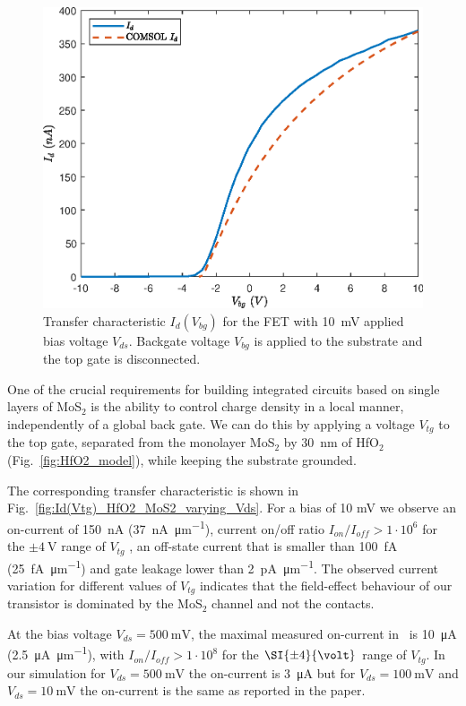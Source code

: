 \documentclass[electronics,article,submit,moreauthors,pdftex]{Definitions/mdpi}
\begin{document}
\begin{figure}[H]
	\centering
	\includegraphics[width=.75\textwidth]{Grafici/Id(Vbg)_HfO2_MoS2.eps} 
	\caption{Transfer characteristic $I_d(V_{bg})$ for the FET with \SI{10}{\milli \volt} applied bias voltage $V_{ds}$. Backgate voltage $V_{bg}$ is applied to the substrate and the top gate is disconnected.}
	\label{fig:Id(Vbg)_HfO2_MoS2}
\end{figure}

One of the crucial requirements for building integrated circuits based on single layers of MoS$_2$ is the ability to control charge density in a local manner, independently of a global back gate. We can do this by applying a voltage $V_{tg}$ to the top gate, separated from the monolayer MoS$_2$ by \SI{30}{\nano \meter} of HfO$_2$ (Fig.~\ref{fig:HfO2_model}), while keeping the substrate grounded.

The corresponding transfer characteristic is shown in Fig.~\ref{fig:Id(Vtg)_HfO2_MoS2_varying_Vds}. For a bias of 10 mV we observe an on-current of \SI{150}{\nano\ampere} (\SI{37}{\nano\ampere \per \micro \meter}), current on/off ratio $I_{on}/I_{off} > 1 \cdot 10^6$ for the $\pm \SI{4}{\volt}$ range of $V_{tg}$ , an off-state current that is smaller than \SI{100}{\femto\ampere} (\SI{25}{\femto\ampere \per \micro \meter}) and gate leakage lower than \SI{2}{\pico \ampere \per \micro \meter}. The observed current variation for different values of $V_{tg}$ indicates that the field-effect behaviour of our transistor is dominated by the MoS$_2$ channel and not the contacts.

At the bias voltage $V_{ds} = \SI{500}{\milli \volt}$, the maximal measured on-current in~\cite{Radisavljevic:Si_MoS2} is \SI{10}{\micro \ampere} (\SI{2.5}{\micro\ampere \per \micro \meter}), with $I_{on}/I_{off} > 1 \cdot 10^8$ for the $\SI{\pm 4}{\volt}$ range of $V_{tg}$. In our simulation for $V_{ds} = \SI{500}{\milli \volt}$ the on-current is \SI{3}{\micro \ampere} but for  $V_{ds} = \SI{100}{\milli \volt}$ and  $V_{ds} = \SI{10}{\milli \volt}$ the on-current is the same as reported in the paper. 
\end{document}

